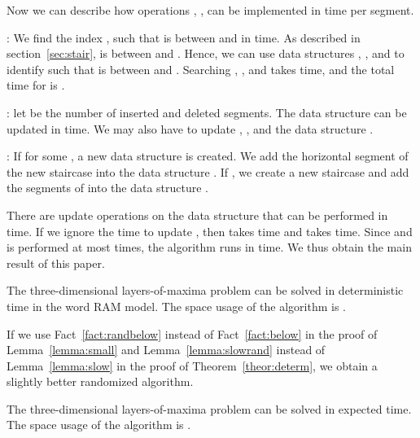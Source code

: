 \documentclass[10pt]{llncs}
\newenvironment{itemize*}{\begin{itemize}\setlength{\itemsep}{0pt}\setlength{\parskip}{0pt}\setlength{\parsep}{0pt}\setlength{\topsep}{0pt}\setlength{\partopsep}{0pt}}{\end{itemize}}
\begin{document}
Now we can describe how operations , ,  can 
be implemented in  time per segment. 
\begin{itemize*}
\item
: We find the index , such that  is between  
 and  in  time. 
As described in section~\ref{sec:stair},  is between  
and . Hence, we can use  data structures
, , and  to identify  such that 
 is between   and . 
Searching , , and  takes  
time, and the total time for  is .
\item
: let  be the number of inserted and deleted 
segments. The data structure  
can be updated in  time. We may also have to update 
, , and the data structure
 .
\item
: If  for some , a new data structure  is
 created. We add the horizontal segment of the new staircase into 
the data structure . 
If , we create a new staircase  and add the segments of 
 into the data structure .
\end{itemize*}
There are  update operations on the data structure 
that can be performed in  time. 
If we ignore the time to update , then  takes 
 time and  takes  time. 
Since  and  is performed 
at most  times, the algorithm runs in  
time. We thus obtain the main result of this paper.
\begin{theorem}\label{theor:determ}
The three-dimensional layers-of-maxima problem can be solved in 
 deterministic time in the word RAM model. 
The space usage of the algorithm is .
\end{theorem}
If we use Fact~\ref{fact:randbelow} instead of Fact~\ref{fact:below} 
in the proof of Lemma~\ref{lemma:small} and Lemma~\ref{lemma:slowrand} 
instead of Lemma~\ref{lemma:slow} in the proof of Theorem~\ref{theor:determ}, 
we  obtain a slightly better randomized algorithm. 
\begin{theorem}
The three-dimensional layers-of-maxima problem 
can be solved in  expected time. 
The space usage of the algorithm is .
\end{theorem}
\end{document}
